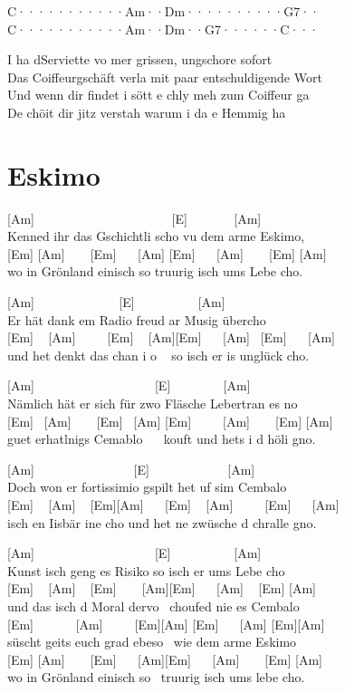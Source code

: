 \documentclass[
  letterpaper,
  twoside=false]{scrbook}
\begin{document}
\textbar C·······\textbar····Am··\textbar Dm······\textbar····G7··\textbar{}\\
\textbar C·······\textbar····Am··\textbar Dm··G7··\textbar····C···\textbar{}

I ha d\textquotesingle Serviette vo mer grissen, ungschore sofort\\
Das Coiffeurgschäft verla mit paar entschuldigende Wort\\
Und wenn dir findet i sött e chly meh zum Coiffeur ga\\
De chöit dir jitz verstah warum i da e Hemmig ha

\hypertarget{eskimo}{%
\chapter{Eskimo}\label{eskimo}}

{[}Am{]} ~ ~ ~ ~ ~ ~ ~ ~ ~ ~ ~ ~ ~{[}E{]} ~ ~ ~ ~ {[}Am{]}\\
Kenned ihr das Gschichtli scho vu dem arme Eskimo,\\
{[}Em{]} {[}Am{]} ~ ~ {[}Em{]} ~ ~{[}Am{]} {[}Em{]} ~ ~{[}Am{]} ~ ~
{[}Em{]} {[}Am{]}\\
wo in Grönland einisch so truurig isch ums Lebe cho.

{[}Am{]} ~ ~ ~ ~ ~ ~ ~ ~{[}E{]} ~ ~ ~ ~ ~ ~{[}Am{]}\\
Er hät dank em Radio freud ar Musig übercho\\
{[}Em{]} ~ {[}Am{]} ~ ~ ~{[}Em{]} ~ {[}Am{]}{[}Em{]} ~ ~{[}Am{]}
~{[}Em{]} ~ ~{[}Am{]}\\
und het denkt das chan i o ~ so isch er is unglück cho.

{[}Am{]} ~ ~ ~ ~ ~ ~ ~ ~ ~ ~ ~ {[}E{]} ~ ~ ~ ~ ~{[}Am{]}\\
Nämlich hät er sich für zwo Fläsche Lebertran es no\\
{[}Em{]} ~{[}Am{]} ~ ~ {[}Em{]} ~{[}Am{]} {[}Em{]} ~ ~ ~{[}Am{]} ~ ~
{[}Em{]} {[}Am{]}\\
guet erhatlnigs Cemablo ~ ~kouft und hets i d höli gno.

{[}Am{]} ~ ~ ~ ~ ~ ~ ~ ~ ~ {[}E{]} ~ ~ ~ ~ ~ ~ ~ {[}Am{]}\\
Doch won er fortissimio gspilt het uf sim Cembalo\\
{[}Em{]} ~ {[}Am{]} ~ {[}Em{]}{[}Am{]} ~ ~{[}Em{]} ~ {[}Am{]} ~ ~
~{[}Em{]} ~ ~{[}Am{]}\\
isch en Iisbär ine cho und het ne zwüsche d chralle gno.

{[}Am{]} ~ ~ ~ ~ ~ ~ ~ ~ ~ ~ ~ {[}E{]} ~ ~ ~ ~ ~ ~{[}Am{]}\\
Kunst isch geng es Risiko so isch er ums Lebe cho\\
{[}Em{]} ~ {[}Am{]} ~ {[}Em{]} ~ ~ {[}Am{]}{[}Em{]} ~ ~{[}Am{]} ~
{[}Em{]} {[}Am{]}\\
und das isch d Moral dervo ~choufed nie es Cembalo\\
{[}Em{]} ~ ~ ~ ~{[}Am{]} ~ ~ ~{[}Em{]}{[}Am{]} {[}Em{]} ~ ~{[}Am{]}
{[}Em{]}{[}Am{]}\\
süscht geits euch grad ebeso ~wie dem arme Eskimo\\
{[}Em{]} {[}Am{]} ~ ~ {[}Em{]} ~ ~{[}Am{]}{[}Em{]} ~ ~{[}Am{]} ~ ~
{[}Em{]} {[}Am{]}\\
wo in Grönland einisch so ~truurig isch ums lebe cho.
\end{document}
